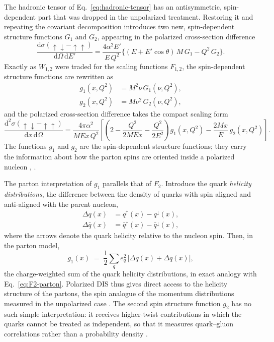 The hadronic tensor of Eq.~\eqref{eq:hadronic-tensor} has an antisymmetric,
spin-dependent part that was dropped in the unpolarized treatment. Restoring it and
repeating the covariant decomposition introduces two new, spin-dependent structure
functions $G_{1}$ and $G_{2}$, appearing in the polarized cross-section difference
\begin{equation}
    \frac{\mathrm{d}\sigma(\uparrow\downarrow - \uparrow\uparrow)}
         {\mathrm{d}\Omega\,\mathrm{d}E'}
    = \frac{4\alpha^{2}E'}{E\,Q^{2}}
      \bigl\{(E + E'\cos\theta)\,M\,G_{1} - Q^{2}\,G_{2}\bigr\}.
    \label{eq:polarized-xsec}
\end{equation}
Exactly as $W_{1,2}$ were traded for the scaling functions $F_{1,2}$, the spin-dependent
structure functions are rewritten as
\begin{align}
    g_{1}(x,Q^{2}) &= M^{2}\nu\,G_{1}(\nu,Q^{2}),
    \label{eq:g1-def}\\
    g_{2}(x,Q^{2}) &= M\nu^{2}\,G_{2}(\nu,Q^{2}),
    \label{eq:g2-def}
\end{align}
and the polarized cross-section difference takes the compact scaling form
\begin{equation}
    \frac{\mathrm{d}^{2}\sigma(\uparrow\downarrow - \uparrow\uparrow)}
         {\mathrm{d}x\,\mathrm{d}\Omega}
    = \frac{4\pi\alpha^{2}}{M E x\,Q^{2}}
      \left[\left(2 - \frac{Q^{2}}{2M E x} - \frac{Q^{2}}{2E^{2}}\right)
      g_{1}(x,Q^{2}) - \frac{2Mx}{E}\,g_{2}(x,Q^{2})\right].
    \label{eq:g1g2-xsec}
\end{equation}
The functions $g_{1}$ and $g_{2}$ are the spin-dependent structure functions; they carry
the information about how the parton spins are oriented inside a polarized nucleon
\cite[Ch.~1]{Amsler2018}, \cite[Ch.~4.6]{ThomasWeise2001}.

The parton interpretation of $g_{1}$ parallels that of $F_{2}$. Introduce the quark
\emph{helicity distributions}, the difference between the density of quarks with spin
aligned and anti-aligned with the parent nucleon,
\begin{align}
    \Delta q(x) &= q^{\uparrow}(x) - q^{\downarrow}(x),
    \label{eq:delta-q}\\
    \Delta\bar q(x) &= \bar q^{\uparrow}(x) - \bar q^{\downarrow}(x),
    \label{eq:delta-qbar}
\end{align}
where the arrows denote the quark helicity relative to the nucleon spin. Then, in the
parton model,
\begin{equation}
    g_{1}(x) \;=\; \frac{1}{2}\sum_{q} e_{q}^{2}\,
    \bigl[\Delta q(x) + \Delta\bar q(x)\bigr],
    \label{eq:g1-parton}
\end{equation}
the charge-weighted sum of the quark helicity distributions, in exact analogy with
Eq.~\eqref{eq:F2-parton}. Polarized DIS thus gives direct access to the helicity
structure of the partons, the spin analogue of the momentum distributions measured in
the unpolarized case \cite[Ch.~4.6]{ThomasWeise2001}. The second spin structure function
$g_{2}$ has no such simple interpretation: it receives higher-twist contributions in
which the quarks cannot be treated as independent, so that it measures quark--gluon
correlations rather than a probability density \cite[Ch.~4.6]{ThomasWeise2001}.

